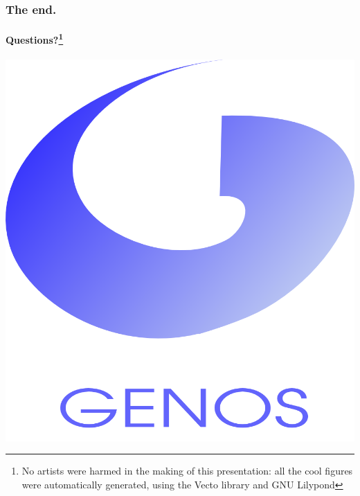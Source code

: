 \documentclass{beamer}
\begin{document}
\begin{frame}
  \frametitle{The end.}
  \framesubtitle{Questions?\footnote{No artists were harmed in the making of this presentation:
    all the cool figures were automatically generated, using the
    Vecto library and GNU Lilypond}}
  \centering
  \includegraphics[scale=0.3, trim = -25em 0em 0em 0em]{figs/genos}
\end{frame}
\end{document}
